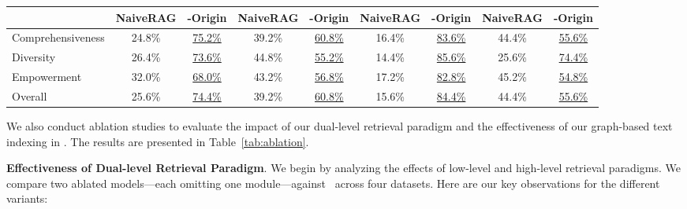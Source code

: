 \begin{table}[t]
{\begin{tabular}{@{}lcccccccc@{}}
\cmidrule(lr){2-3} \cmidrule(lr){4-5} \cmidrule(lr){6-7} \cmidrule(lr){8-9}
                      & NaiveRAG & \textbf{-Origin} & NaiveRAG & \textbf{-Origin} & NaiveRAG & \textbf{-Origin} & NaiveRAG & \textbf{-Origin} \\
\midrule
Comprehensiveness      & 24.8\%      & \underline{75.2\%}     & 39.2\%      & \underline{60.8\%}     & 16.4\%      & \underline{83.6\%}     & 44.4\%      & \underline{55.6\%}     \\
Diversity              & 26.4\%      & \underline{73.6\%}     & 44.8\%      & \underline{55.2\%}     & 14.4\%      & \underline{85.6\%}     & 25.6\%      & \underline{74.4\%}     \\
Empowerment            & 32.0\%      & \underline{68.0\%}     & 43.2\%      & \underline{56.8\%}     & 17.2\%      & \underline{82.8\%}     & 45.2\%      & \underline{54.8\%}     \\
Overall                & 25.6\%      & \underline{74.4\%}     & 39.2\%      & \underline{60.8\%}     & 15.6\%      & \underline{84.4\%}     & 44.4\%      & \underline{55.6\%}     \\
\bottomrule
\end{tabular}
}
\end{table}

We also conduct ablation studies to evaluate the impact of our dual-level retrieval paradigm and the effectiveness of our graph-based text indexing in \model. The results are presented in Table~\ref{tab:ablation}.

\textbf{Effectiveness of Dual-level Retrieval Paradigm}.
We begin by analyzing the effects of low-level and high-level retrieval paradigms. We compare two ablated models—each omitting one module—against \model\ across four datasets. Here are our key observations for the different variants:


